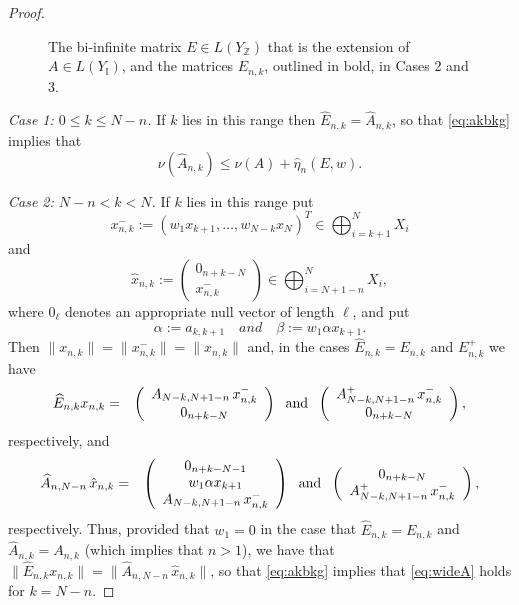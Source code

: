 \documentclass[preprint,1p,11pt]{elsarticle}
\newcommand\A{{\mathcal A}}
\newcommand\I{{\mathbb I}}
\newcommand\Z{{\mathbb Z}}
\numberwithin{equation}{section}   %
\numberwithin{figure}{section}  %
\begin{document}
\begin{proof}
\begin{figure}[t]
\caption{The bi-infinite matrix $E\in L(Y_\Z)$ that is the extension of $A\in L(Y_\I)$, and the matrices $E_{n,k}$, outlined in bold, in Cases 2 and 3.}\label{fig:cases}
\end{figure}

{\em Case 1: $0\leq k\leq N-n$.} If $k$ lies in this range then  $\widehat E_{n,k}=\widehat A_{n,k}$, so that \eqref{eq:akbkg} implies that 
\begin{equation} \label{eq:wideA}
\nu(\widehat A_{n,k})\leq \nu(A)+\hat \eta_n(E,w). 
\end{equation}

{\em Case 2: $N-n<k<N$.} If $k$ lies in this range put 
$$
x^-_{n,k} := (w_1 x_{k+1},\ldots, w_{N-k} x_{N})^T\in \bigoplus_{i=k+1}^N X_{i}
$$
and
$$
\hat x_{n,k} := \left(\begin{array}{c}0_{n+k-N}\\x^-_{n,k}\end{array}\right) \in \bigoplus_{i=N+1-n}^N X_{i},
$$
where $0_{\ell}$ denotes an appropriate null vector of length $\ell$, and put 
$$
\alpha := a_{k,k+1} \quad and \quad  \beta :=w_1\alpha x_{k+1}.
$$
Then $\|x_{n,k}\|=\|x^-_{n,k}\|= \|\hat x_{n,k}\|$ and, in the cases $\widehat E_{n,k}=E_{n,k}$ and $E_{n,k}^+$ we have
\begin{eqnarray*}
\widehat E_{n,k} x_{n,k} &=& \left(\begin{array}{c}A_{N-k,N+1-n} \,x^-_{n,k}\\0_{n+k-N}\end{array}\right) \mbox{\; and \;}  \left(\begin{array}{c}A^+_{N-k,N+1-n} \,x^-_{n,k}\\0_{n+k-N}\end{array}\right),
\end{eqnarray*}
respectively, and
\begin{eqnarray*}
\widehat A_{n,N-n} \,\hat x_{n,k} &=& \left(\begin{array}{c} 0_{n+k-N-1}\\  w_1 \alpha x_{k+1}\\ A_{N-k,N+1-n} \,x^-_{n,k}\end{array}\right) \mbox{\; and \;}
\left(\begin{array}{c} 0_{n+k-N}\\A^+_{N-k,N+1-n} \,x^-_{n,k}\end{array}\right),
\end{eqnarray*}
respectively. Thus, provided that $w_1=0$  in the case that $\widehat E_{n,k}=E_{n,k}$ and $\widehat A_{n,k}=A_{n,k}$ (which implies that $n>1$), we have that $\|\widehat E_{n,k} x_{n,k}\|=\|\widehat A_{n,N-n} \, \hat x_{n,k}\|$, so that \eqref{eq:akbkg} implies that \eqref{eq:wideA} holds for $k=N-n$.


\end{proof}
\end{document}
